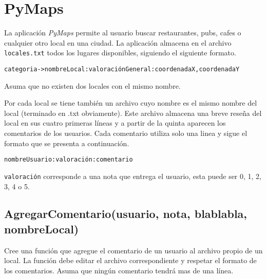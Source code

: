 \section{PyMaps}

La aplicación \textit{PyMaps} permite al usuario buscar restaurantes, pubs, cafes o cualquier otro local en una ciudad. La aplicación almacena en el archivo \texttt{locales.txt} todos los lugares disponibles, siguiendo el siguiente formato.

\begin{center}
    \texttt{categoria->nombreLocal:valoraciónGeneral:coordenadaX,coordenadaY}
\end{center}

Asuma que no existen dos locales con el mismo nombre.\par
Por cada local se tiene también un archivo cuyo nombre es el mismo nombre del local (terminado en .txt obviamente). Este archivo almacena una breve reseña del local en sus cuatro primeras líneas y a partir de la quinta aparecen los comentarios de los usuarios. Cada comentario utiliza solo una linea y sigue el formato que se presenta a continuación.

\begin{center}
    \texttt{nombreUsuario:valoración:comentario}
\end{center}

\texttt{valoración} corresponde a una nota que entrega el usuario, esta puede ser 0, 1, 2, 3, 4 o 5.

\vspace{0.4 cm}
\begin{minipage}[H]{0.5\textwidth}
    \fbox{
    \lstset{ breaklines=true, basicstyle=\footnotesize }
    
    }
    \label{locales init}
\end{minipage}
\begin{minipage}[H]{0.5\textwidth}
    \fbox{
    \lstset{ breaklines=true, basicstyle=\footnotesize }
    
    }
    \label{lila init}
\end{minipage}


\subsection{AgregarComentario(usuario, nota, blablabla, nombreLocal)}

Cree una función que agregue el comentario de un usuario al archivo propio de un local. La función debe editar el archivo correspondiente y respetar el formato de los comentarios. Asuma que ningún comentario tendrá mas de una línea.


